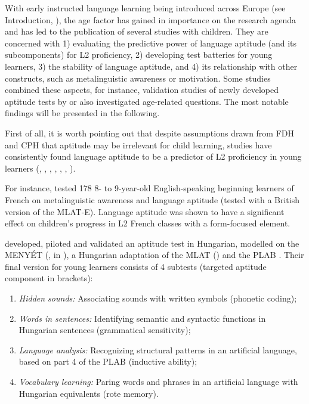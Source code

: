 \documentclass[output=paper]{langscibook}
\begin{document}
With early instructed language learning being introduced across Europe (see Introduction, ), the age factor has gained in importance on the research agenda and has led to the publication of several studies with children. They are concerned with 1) evaluating the predictive power of language aptitude (and its subcomponents) for L2 proficiency, 2) developing test batteries for young learners, 3) the stability of language aptitude, and 4) its relationship with other constructs, such as metalinguistic awareness or motivation. Some studies combined these aspects, for instance, validation studies of newly developed aptitude tests by \citet{KissNikolov2005} or \citet{SuarezVilagran2010} also investigated age-related questions. The most notable findings will be presented in the following.

First of all, it is worth pointing out that despite assumptions drawn from FDH and CPH that aptitude may be irrelevant for child learning, studies have consistently found language aptitude to be a predictor of L2 proficiency in young learners (\citealt{BialystokFroehlich1978}, \citealt{KissNikolov2005}, \citealt{Kiss2009}, \citealt{SuarezVilagran2010}, \citealt{Munoz2014}, \citealt{TellierRoehrBrackin2017}, \citealt{RoehrBrackinTellier2019}). 

For instance, \citet{TellierRoehrBrackin2017} tested 178 8- to 9-year-old English-speaking beginning learners of French on metalinguistic awareness and language aptitude (tested with a British version of the MLAT-E). Language aptitude was shown to have a significant effect on children’s progress in L2 French classes with a form-focused element. 

\citet{KissNikolov2005} developed, piloted and validated an aptitude test in Hungarian, modelled on the MENYÉT (\citealt{Otto1996}, in \citealt{KissNikolov2005}), a Hungarian adaptation of the MLAT (\citealt{CarrollSapon1959}) and the PLAB \citep{Pimsleur1966}. Their final version for young learners consists of 4 subtests (targeted aptitude component in brackets): 

\begin{enumerate}\sloppy
\item \textit{Hidden sounds:} Associating sounds with written symbols (phonetic coding);
\item \textit{Words in sentences:} Identifying semantic and syntactic functions in Hungarian sentences (grammatical sensitivity); 
\item \textit{Language analysis:} Recognizing structural patterns in an artificial language, based on part 4 of the PLAB (inductive ability); 
\item \textit{Vocabulary learning:} Paring words and phrases in an artificial language with Hungarian equivalents (rote memory). 
\end{enumerate}
\end{document}
